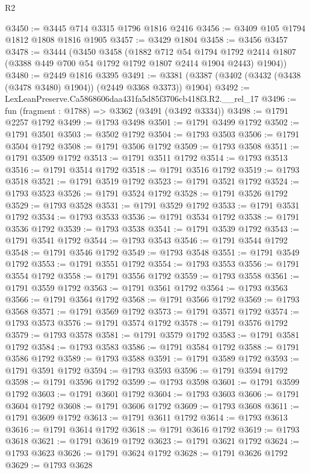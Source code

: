 \begin{lexlean}{R2}
\begin{coremodule}
@3450 := @3445 @714 @3315 @1796 @1816 @2416
@3456 := @3409 @105 @1794 @1812 @1808 @1816 @1905
@3457 := @3429 @1804
@3458 := @3456 @3457
@3478 := @3444
    (@3450
      @3458
      (@1882
        @712
        @54
        @1794
        @1792
        @2414
        @1807
        (@3388 @449 @700 @54 @1792 @1792 @1807 @2414 @1904 @2443)
        @1904))
@3480 := @2449 @1816 @3395
@3491 := @3381 (@3387 (@3402 (@3432 (@3438 (@3478 @3480) @1904)) (@2449 @3368 @3373)) @1904)
@3492 := LexLeanPreserve.Ca5868606daa431fa5d85f3706cb418f3.R2.__rel_17
@3496 := fun (fragment : @1788) => @3362 (@3491 (@3492 @3334))
@3498 := @1791 @2257 @1792
@3499 := @1793 @3498
@3501 := @1791 @3499 @1792
@3502 := @1791 @3501
@3503 := @3502 @1792
@3504 := @1793 @3503
@3506 := @1791 @3504 @1792
@3508 := @1791 @3506 @1792
@3509 := @1793 @3508
@3511 := @1791 @3509 @1792
@3513 := @1791 @3511 @1792
@3514 := @1793 @3513
@3516 := @1791 @3514 @1792
@3518 := @1791 @3516 @1792
@3519 := @1793 @3518
@3521 := @1791 @3519 @1792
@3523 := @1791 @3521 @1792
@3524 := @1793 @3523
@3526 := @1791 @3524 @1792
@3528 := @1791 @3526 @1792
@3529 := @1793 @3528
@3531 := @1791 @3529 @1792
@3533 := @1791 @3531 @1792
@3534 := @1793 @3533
@3536 := @1791 @3534 @1792
@3538 := @1791 @3536 @1792
@3539 := @1793 @3538
@3541 := @1791 @3539 @1792
@3543 := @1791 @3541 @1792
@3544 := @1793 @3543
@3546 := @1791 @3544 @1792
@3548 := @1791 @3546 @1792
@3549 := @1793 @3548
@3551 := @1791 @3549 @1792
@3553 := @1791 @3551 @1792
@3554 := @1793 @3553
@3556 := @1791 @3554 @1792
@3558 := @1791 @3556 @1792
@3559 := @1793 @3558
@3561 := @1791 @3559 @1792
@3563 := @1791 @3561 @1792
@3564 := @1793 @3563
@3566 := @1791 @3564 @1792
@3568 := @1791 @3566 @1792
@3569 := @1793 @3568
@3571 := @1791 @3569 @1792
@3573 := @1791 @3571 @1792
@3574 := @1793 @3573
@3576 := @1791 @3574 @1792
@3578 := @1791 @3576 @1792
@3579 := @1793 @3578
@3581 := @1791 @3579 @1792
@3583 := @1791 @3581 @1792
@3584 := @1793 @3583
@3586 := @1791 @3584 @1792
@3588 := @1791 @3586 @1792
@3589 := @1793 @3588
@3591 := @1791 @3589 @1792
@3593 := @1791 @3591 @1792
@3594 := @1793 @3593
@3596 := @1791 @3594 @1792
@3598 := @1791 @3596 @1792
@3599 := @1793 @3598
@3601 := @1791 @3599 @1792
@3603 := @1791 @3601 @1792
@3604 := @1793 @3603
@3606 := @1791 @3604 @1792
@3608 := @1791 @3606 @1792
@3609 := @1793 @3608
@3611 := @1791 @3609 @1792
@3613 := @1791 @3611 @1792
@3614 := @1793 @3613
@3616 := @1791 @3614 @1792
@3618 := @1791 @3616 @1792
@3619 := @1793 @3618
@3621 := @1791 @3619 @1792
@3623 := @1791 @3621 @1792
@3624 := @1793 @3623
@3626 := @1791 @3624 @1792
@3628 := @1791 @3626 @1792
@3629 := @1793 @3628

\end{coremodule}
\end{lexlean}
